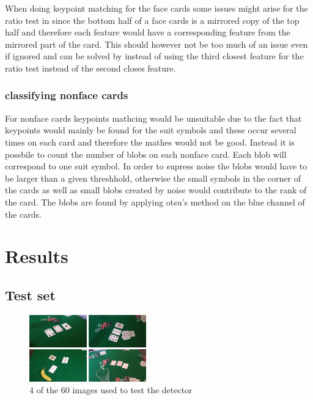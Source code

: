 \documentclass[journal,twoside]{IEEEtran}
\begin{document}
When doing keypoint matching for the face cards some issues might arise for the ratio test in \cite{SIFT} since the bottom half of a face cards is a mirrored copy of the top half and therefore each feature would have a corresponding feature from the mirrored part of the card. This should however not be too much of an issue even if ignored and can be solved by instead of using the third closest feature for the ratio test instead of the second  closes feature. 

\subsubsection{classifying nonface cards}

For nonface cards keypoints mathcing would be unsuitable due to the fact that keypoints would mainly be found for the suit symbols and these occur several times on each card and therefore the mathes would not be good.
Instead it is possbile to count the number of blobs on each nonface card. Each blob will correspond to one suit symbol. In order to supress noise the blobs would have to be larger than a given threshhold, otherwise the small symbols in the corner of the cards as well as small blobs created by noise would contribute to the rank of the card. The blobs are found by applying otsu's method on the blue channel of the cards.

\section{Results}

\subsection{Test set}

\begin{figure}[placement h]
\centering
\includegraphics[width=0.45\textwidth]{images/testimgs.png}
\caption{4 of the 60 images used to test the detector}
\label{fig:TestImages}
\end{figure}
\end{document}
